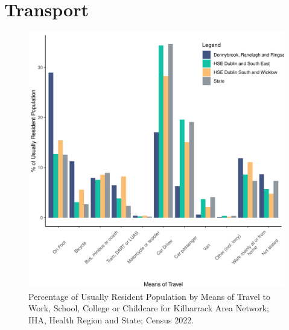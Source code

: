 \documentclass{article}
\begin{document}
\section{Transport}\label{sect:Trans}
\begin{figure}[H]
	\centering
	\includegraphics[width = 120mm]{../figures/TravelED.pdf}
	\caption{Percentage of Usually Resident Population by Means of Travel to Work, School, College or Childcare for Kilbarrack Area Network; IHA, Health Region and State; Census 2022.}
	\label{fig:vbnv}
	\end{figure}
\end{document}
